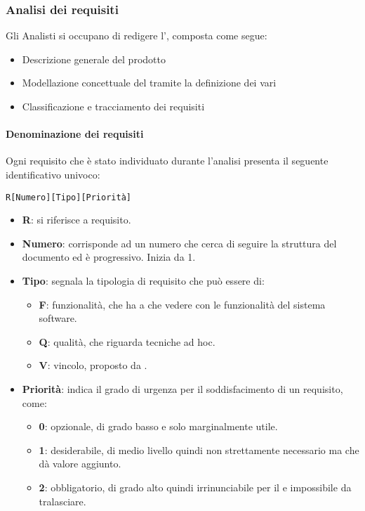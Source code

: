         \subsubsection{Analisi dei requisiti}\label{PP:Sviluppo:AdR}
		Gli Analisti si occupano di redigere l'\Doc{\AdRv}, composta come segue:
		\begin{itemize}
			\item Descrizione generale del prodotto
			\item Modellazione concettuale del  tramite la definizione dei vari 
			\item Classificazione e tracciamento dei requisiti
		\end{itemize}

		\paragraph{Denominazione dei requisiti}\label{PP:Sviluppo:AdR:DenominazioneRequisiti}
		Ogni requisito che è stato individuato durante l'analisi presenta il seguente identificativo univoco:
		\begin{center}
			\texttt{R[Numero][Tipo][Priorità]}
		\end{center}

		\begin{itemize}
			\item \textbf{R}: si riferisce a requisito.
		 	\item \textbf{Numero}: corrisponde ad un numero che cerca di seguire la struttura del documento ed è progressivo. Inizia da 1.
		 	\item \textbf{Tipo}: segnala la tipologia di requisito che può essere di:
		 	\begin{itemize}
		 		\item \textbf{F}: funzionalità, che ha a che vedere con le funzionalità del sistema software.
		 		\item \textbf{Q}: qualità, che riguarda tecniche ad hoc.
		 		\item \textbf{V}: vincolo, proposto da \II.
		 	\end{itemize}
	 		\item \textbf{Priorità}: indica il grado di urgenza per il soddisfacimento di un requisito, come:
	 		\begin{itemize}
	 			\item \textbf{0}: opzionale, di grado basso e solo marginalmente utile.
	 			\item \textbf{1}: desiderabile, di medio livello quindi non strettamente necessario ma che dà valore aggiunto.
	 			\item \textbf{2}: obbligatorio, di grado alto quindi irrinunciabile per il  e impossibile da tralasciare.
	 		\end{itemize}
		\end{itemize}
	
